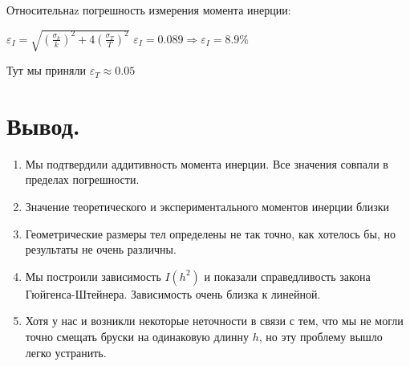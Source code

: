 \documentclass[12pt,a4paper]{article}
\begin{document}
		Относительнаz погрешность измерения момента инерции:
		\begin{flushleft}
			\begin{spacing}{1.4}
				$ \varepsilon_{I} = \sqrt{\left(\frac{\sigma_{k}}{k}\right)^2 + 4\left(\frac{\sigma_{T}}{T}\right)^2} $
				$ \varepsilon_{I} = 0.089\Rightarrow\varepsilon_{I}=8.9\% $
			\end{spacing} 
		\end{flushleft} 
Тут мы приняли $\varepsilon_{T}\approx0.05$
		 
		\newpage		 
		 
\section{Вывод.}
\begin{enumerate}
\item Мы подтвердили аддитивность момента инерции. Все значения совпали в пределах погрешности.
\item Значение теоретического и экспериментального моментов инерции близки
\item Геометрические размеры тел определены не так точно, как хотелось бы, но результаты не очень различны.
\item Мы построили зависимость $I(h^2)$ и показали справедливость закона Гюйгенса-Штейнера. Зависимость очень близка к линейной.
\item Хотя у нас и возникли некоторые неточности в связи с тем, что мы не могли точно смещать бруски на одинаковую длинну $h$, но эту проблему вышло легко устранить. 
\end{enumerate}	
\end{document}
